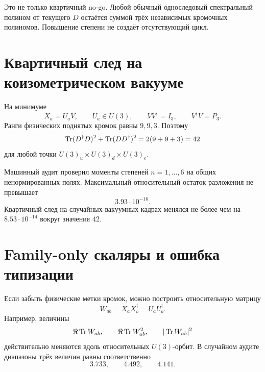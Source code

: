 Это не только квартичный no-go. Любой обычный односледовый спектральный
полином от текущего $D$ остаётся суммой трёх независимых кромочных
полиномов. Повышение степени не создаёт отсутствующий цикл.

\section{Квартичный след на коизометрическом вакууме}

На минимуме
\begin{equation}
 X_a=U_aV,
 \qquad
 U_a\in U(3),
 \qquad
 VV^\dagger=I_3,
 \qquad
 V^\dagger V=P_3.
 \label{eq:v7-quartic-coisometric-vacuum}
\end{equation}
Ранги физических поднятых кромок равны $9,9,3$. Поэтому
\begin{equation}
 \operatorname{Tr}(D^\dagger D)^2+\operatorname{Tr}(DD^\dagger)^2
 =2(9+9+3)=42
 \label{eq:v7-quartic-vacuum-trace}
\end{equation}
для любой точки $U(3)_u\times U(3)_d\times U(3)_e$.

Машинный аудит проверил моменты степеней $n=1,\ldots,6$ на общих
ненормированных полях. Максимальный относительный остаток разложения не
превышает
\begin{equation}
 3.93\cdot10^{-16}.
 \label{eq:v7-polynomial-splitting-residual}
\end{equation}
Квартичный след на случайных вакуумных кадрах менялся не более чем на
$8.53\cdot10^{-14}$ вокруг значения $42$.

\section{Family-only скаляры и ошибка типизации}

Если забыть физические метки кромок, можно построить относительную матрицу
\begin{equation}
 W_{ab}=X_aX_b^\dagger=U_aU_b^\dagger.
 \label{eq:v7-family-only-relative-matrix}
\end{equation}
Например, величины
\begin{equation}
 \Re\operatorname{Tr} W_{ab},
 \qquad
 \Re\operatorname{Tr} W_{ab}^2,
 \qquad
 |\operatorname{Tr} W_{ab}|^2
 \label{eq:v7-family-only-sensitive-scalars}
\end{equation}
действительно меняются вдоль относительных $U(3)$-орбит. В случайном
аудите диапазоны трёх величин равны соответственно
\begin{equation}
 3.733,
 \qquad
 4.492,
 \qquad
 4.141.
 \label{eq:v7-family-only-scalar-ranges}
\end{equation}

